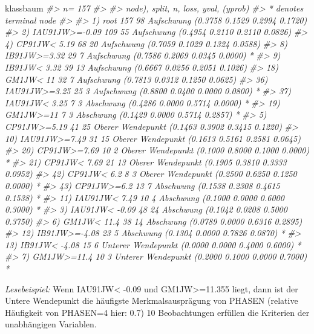 \documentclass[12pt,]{book}
\newenvironment{Shaded}{\begin{snugshade}}{\end{snugshade}}
\newcommand{\CommentTok}[1]{\textcolor[rgb]{0.56,0.35,0.01}{\textit{{#1}}}}
\newcommand{\NormalTok}[1]{{#1}}
\begin{document}
\begin{Shaded}
\begin{Highlighting}[]
\NormalTok{klassbaum}
\CommentTok{#> n= 157 }
\CommentTok{#> }
\CommentTok{#> node), split, n, loss, yval, (yprob)}
\CommentTok{#>       * denotes terminal node}
\CommentTok{#> }
\CommentTok{#>  1) root 157 98 Aufschwung (0.3758 0.1529 0.2994 0.1720)  }
\CommentTok{#>    2) IAU91JW>=-0.09 109 55 Aufschwung (0.4954 0.2110 0.2110 0.0826)  }
\CommentTok{#>      4) CP91JW< 5.19 68 20 Aufschwung (0.7059 0.1029 0.1324 0.0588)  }
\CommentTok{#>        8) IB91JW>=3.32 29  7 Aufschwung (0.7586 0.2069 0.0345 0.0000) *}
\CommentTok{#>        9) IB91JW< 3.32 39 13 Aufschwung (0.6667 0.0256 0.2051 0.1026)  }
\CommentTok{#>         18) GM1JW< 11 32  7 Aufschwung (0.7813 0.0312 0.1250 0.0625)  }
\CommentTok{#>           36) IAU91JW>=3.25 25  3 Aufschwung (0.8800 0.0400 0.0000 0.0800) *}
\CommentTok{#>           37) IAU91JW< 3.25 7  3 Abschwung (0.4286 0.0000 0.5714 0.0000) *}
\CommentTok{#>         19) GM1JW>=11 7  3 Abschwung (0.1429 0.0000 0.5714 0.2857) *}
\CommentTok{#>      5) CP91JW>=5.19 41 25 Oberer Wendepunkt (0.1463 0.3902 0.3415 0.1220)  }
\CommentTok{#>       10) IAU91JW>=7.49 31 15 Oberer Wendepunkt (0.1613 0.5161 0.2581 0.0645)  }
\CommentTok{#>         20) CP91JW>=7.69 10  2 Oberer Wendepunkt (0.1000 0.8000 0.1000 0.0000) *}
\CommentTok{#>         21) CP91JW< 7.69 21 13 Oberer Wendepunkt (0.1905 0.3810 0.3333 0.0952)  }
\CommentTok{#>           42) CP91JW< 6.2 8  3 Oberer Wendepunkt (0.2500 0.6250 0.1250 0.0000) *}
\CommentTok{#>           43) CP91JW>=6.2 13  7 Abschwung (0.1538 0.2308 0.4615 0.1538) *}
\CommentTok{#>       11) IAU91JW< 7.49 10  4 Abschwung (0.1000 0.0000 0.6000 0.3000) *}
\CommentTok{#>    3) IAU91JW< -0.09 48 24 Abschwung (0.1042 0.0208 0.5000 0.3750)  }
\CommentTok{#>      6) GM1JW< 11.4 38 14 Abschwung (0.0789 0.0000 0.6316 0.2895)  }
\CommentTok{#>       12) IB91JW>=-4.08 23  5 Abschwung (0.1304 0.0000 0.7826 0.0870) *}
\CommentTok{#>       13) IB91JW< -4.08 15  6 Unterer Wendepunkt (0.0000 0.0000 0.4000 0.6000) *}
\CommentTok{#>      7) GM1JW>=11.4 10  3 Unterer Wendepunkt (0.2000 0.1000 0.0000 0.7000) *}
\end{Highlighting}
\end{Shaded}

\emph{Lesebeispiel:} Wenn IAU91JW\textless{} -0.09 und
GM1JW\textgreater{}=11.355 liegt, dann ist der Untere Wendepunkt die
häufigste Merkmalsausprägung von PHASEN (relative Häufigkeit von
PHASEN=4 hier: 0.7) 10 Beobachtungen erfüllen die Kriterien der
unabhängigen Variablen.
\end{document}
